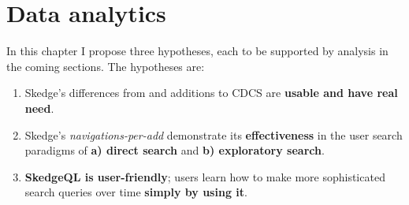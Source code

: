 
\chapter{Data analytics}

In this chapter I propose three hypotheses, each to be supported by analysis in the coming sections. The hypotheses are:

\begin{enumerate}
  \item Skedge's differences from and additions to CDCS are \textbf{usable and have real need}.

  \item Skedge’s \emph{navigations-per-add} demonstrate its \textbf{effectiveness} in the user search paradigms of \textbf{a) direct search} and \textbf{b) exploratory search}.

  \item \textbf{SkedgeQL is user-friendly}; users learn how to make more sophisticated search queries over time \textbf{simply by using it}.
\end{enumerate}


\clearpage


\clearpage


\clearpage

